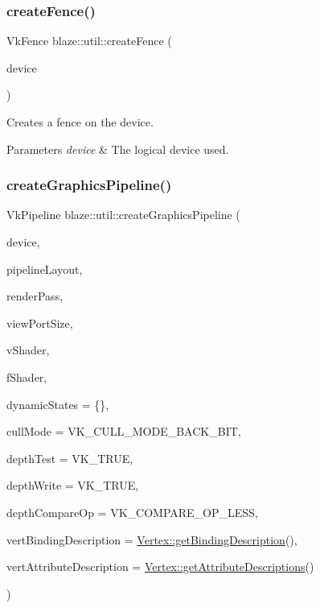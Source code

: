 \subsubsection{\texorpdfstring{create\+Fence()}{createFence()}}
{\footnotesize\ttfamily Vk\+Fence blaze\+::util\+::create\+Fence (\begin{DoxyParamCaption}\item[{Vk\+Device}]{device }\end{DoxyParamCaption})}



Creates a fence on the device. 


\begin{DoxyParams}{Parameters}
{\em device} & The logical device used. \\
\hline
\end{DoxyParams}
\mbox{\label{namespaceblaze_1_1util_a601f0f6b171e21ad20e0d4a384fdba6c}} 
\subsubsection{\texorpdfstring{create\+Graphics\+Pipeline()}{createGraphicsPipeline()}}
{\footnotesize\ttfamily Vk\+Pipeline blaze\+::util\+::create\+Graphics\+Pipeline (\begin{DoxyParamCaption}\item[{Vk\+Device}]{device,  }\item[{Vk\+Pipeline\+Layout}]{pipeline\+Layout,  }\item[{Vk\+Render\+Pass}]{render\+Pass,  }\item[{Vk\+Extent2D}]{view\+Port\+Size,  }\item[{const std\+::string \&}]{v\+Shader,  }\item[{const std\+::string \&}]{f\+Shader,  }\item[{const std\+::vector$<$ Vk\+Dynamic\+State $>$ \&}]{dynamic\+States = {\ttfamily \{\}},  }\item[{Vk\+Cull\+Mode\+Flags}]{cull\+Mode = {\ttfamily VK\+\_\+CULL\+\_\+MODE\+\_\+BACK\+\_\+BIT},  }\item[{Vk\+Bool32}]{depth\+Test = {\ttfamily VK\+\_\+TRUE},  }\item[{Vk\+Bool32}]{depth\+Write = {\ttfamily VK\+\_\+TRUE},  }\item[{Vk\+Compare\+Op}]{depth\+Compare\+Op = {\ttfamily VK\+\_\+COMPARE\+\_\+OP\+\_\+LESS},  }\item[{Vk\+Vertex\+Input\+Binding\+Description}]{vert\+Binding\+Description = {\ttfamily \hyperlink{structblaze_1_1Vertex_a81e9b6e602df735ad45fcc5d2c3305c6}{Vertex\+::get\+Binding\+Description}()},  }\item[{const std\+::vector$<$ Vk\+Vertex\+Input\+Attribute\+Description $>$ \&}]{vert\+Attribute\+Description = {\ttfamily \hyperlink{structblaze_1_1Vertex_aa9ee165c3cfdac311ca8ffc382524d4b}{Vertex\+::get\+Attribute\+Descriptions}()} }\end{DoxyParamCaption})}



